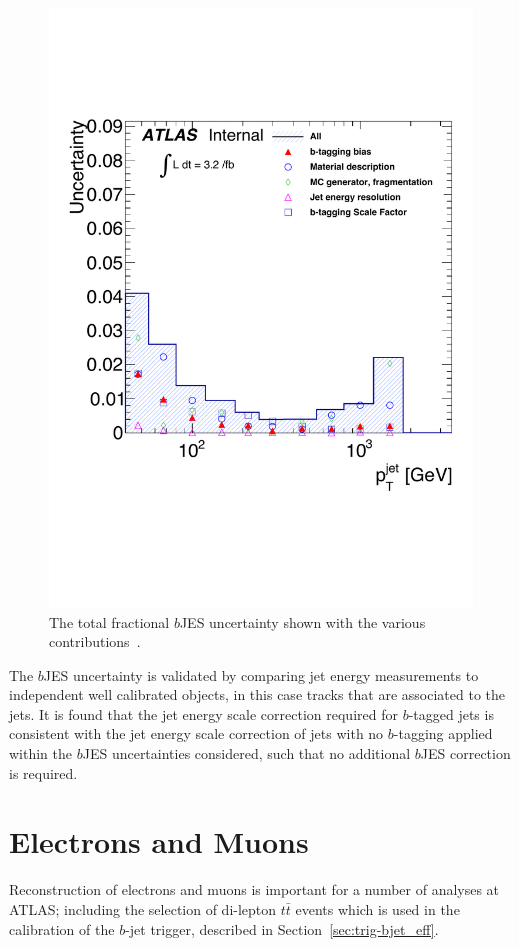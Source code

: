 \begin{figure}[!hbt]
  \begin{center}
    \includegraphics[width=0.5\linewidth, angle=0]{figs/Objects/bjets_bJES_uncert_edit.pdf}
  \vspace{-2em}
  \end{center}
  \caption[The total fractional $b$JES uncertainty shown with the various contributions.]
          {\label{fig:obj-bjets_bJES_uncert} The total fractional $b$JES uncertainty shown with the various contributions~\cite{dibjet-int_mori16}.}
\end{figure}

The $b$JES uncertainty is validated by comparing jet energy measurements to independent well calibrated objects, in this case tracks that are associated to the jets.
It is found that the jet energy scale correction required for $b$-tagged jets is consistent with the jet energy scale correction of jets with no $b$-tagging applied
within the $b$JES uncertainties considered, such that no additional $b$JES correction is required.

\section{Electrons and Muons}
\label{sec:obj-leptons}

Reconstruction of electrons and muons
is important for a number of analyses at ATLAS;
including the selection of di-lepton $t\bar{t}$ events
which is used in the calibration of  the $b$-jet trigger,
described in Section~\ref{sec:trig-bjet_eff}.

